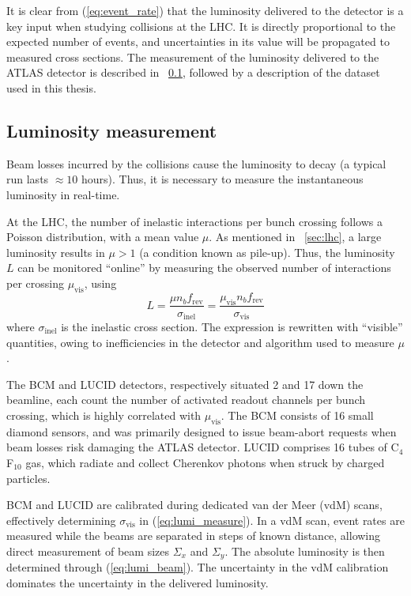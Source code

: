 
It is clear from (\ref{eq:event_rate}) that the luminosity delivered to the detector is a 
key input when studying \pp collisions at the \ac{LHC}. It is directly proportional to the 
expected number of events, and uncertainties in its value will be propagated to measured 
cross sections. The measurement of the luminosity delivered to the ATLAS detector is 
described in \Section~\ref{sec:dataset:lumi}, followed by a description of the dataset 
used in this thesis.



\subsection{Luminosity measurement}
\label{sec:dataset:lumi}

Beam losses incurred by the collisions cause the luminosity to decay (a typical run lasts 
${\approx}10$ hours). Thus, it is necessary to measure the instantaneous luminosity in 
real-time.

At the \ac{LHC}, the number of inelastic \pp interactions per bunch crossing follows a 
Poisson distribution, with a mean value $\mu$. As mentioned in \Section~\ref{sec:lhc}, 
a large luminosity results in $\mu > 1$ (a condition known as pile-up). Thus, the 
luminosity $L$ can be monitored ``online'' by measuring the observed number of interactions
per crossing $\mu_{\text{vis}}$, using \cite{Lumi2011}
\begin{equation}
	L = \frac{\mu n_b f_{\text{rev}}}{\sigma_{\text{inel}}}
	= \frac{\mu_{\text{vis}} n_b f_{\text{rev}}}{\sigma_{\text{vis}}}
	\label{eq:lumi_measure}
\end{equation}
where $\sigma_{\text{inel}}$ is the inelastic \pp cross section. The expression is 
rewritten with ``visible'' quantities, owing to inefficiencies in the detector and 
algorithm used to measure $\mu$.

The \ac{BCM} and LUCID detectors, respectively situated \unit{2}{\metre} and 
\unit{17}{\metre} down the beamline, each count the number of activated readout channels 
per bunch crossing, which is highly correlated with $\mu_{\text{vis}}$. The \ac{BCM} 
consists of 16 small diamond sensors, and was primarily designed to issue beam-abort 
requests when beam losses risk damaging the ATLAS detector. LUCID comprises 16 tubes of 
C$_4$F$_{10}$ gas, which radiate and collect Cherenkov photons when struck by charged 
particles.

\ac{BCM} and LUCID are calibrated during dedicated van der Meer (vdM) scans, effectively 
determining $\sigma_{\text{vis}}$ in (\ref{eq:lumi_measure}). In a vdM scan, event rates 
are measured while the beams are separated in steps of known distance, allowing direct 
measurement of beam sizes $\varSigma_x$ and $\varSigma_y$. The absolute luminosity is then 
determined through (\ref{eq:lumi_beam}). The uncertainty in the vdM calibration dominates 
the uncertainty in the delivered luminosity.

